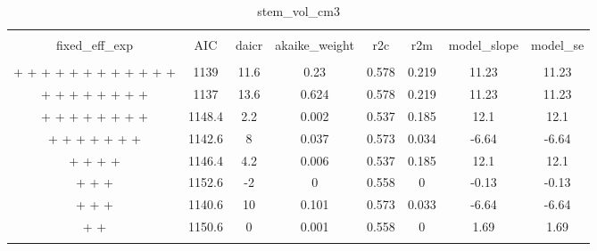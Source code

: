 
\begin{table}[!htbp] \centering 
  \caption{stem_vol_cm3} 
  \label{stem_vol_cm3} 
\begin{tabular}{@{\extracolsep{5pt}} cccccccc} 
\\[-1.8ex]\hline 
\hline \\[-1.8ex] 
fixed\_eff\_exp & AIC & daicr & akaike\_weight & r2c & r2m & model\_slope & model\_se \\ 
\hline \\[-1.8ex] 
 +  +  +  +  +  +  +  +  +  +  +  +  & 1139 & 11.6 & 0.23 & 0.578 & 0.219 & 11.23 & 11.23 \\ 
 +  +  +  +  +  +  +  +  & 1137 & 13.6 & 0.624 & 0.578 & 0.219 & 11.23 & 11.23 \\ 
 +  +  +  +  +  +  +  +  & 1148.4 & 2.2 & 0.002 & 0.537 & 0.185 & 12.1 & 12.1 \\ 
 +  +  +  +  +  +  +  & 1142.6 & 8 & 0.037 & 0.573 & 0.034 & -6.64 & -6.64 \\ 
 +  +  +  +  & 1146.4 & 4.2 & 0.006 & 0.537 & 0.185 & 12.1 & 12.1 \\ 
 +  +  +  & 1152.6 & -2 & 0 & 0.558 & 0 & -0.13 & -0.13 \\ 
 +  +  +  & 1140.6 & 10 & 0.101 & 0.573 & 0.033 & -6.64 & -6.64 \\ 
 +  +  & 1150.6 & 0 & 0.001 & 0.558 & 0 & 1.69 & 1.69 \\ 
\hline \\[-1.8ex] 
\end{tabular} 
\end{table} 
